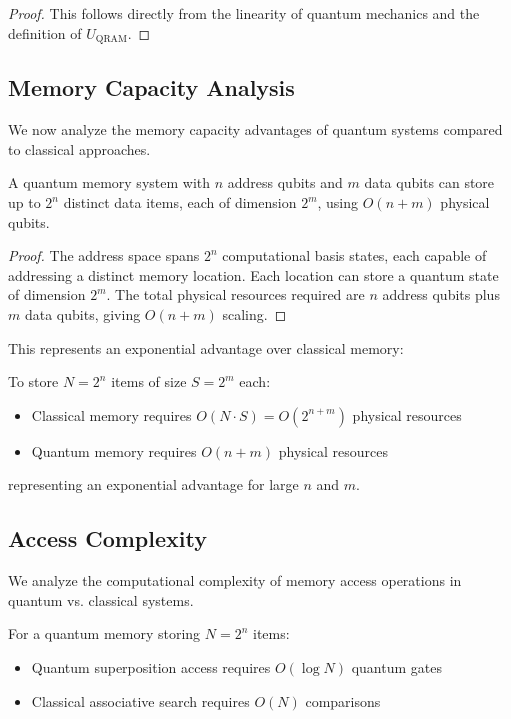\begin{proof}
This follows directly from the linearity of quantum mechanics and the definition of $U_{\text{QRAM}}$.
\end{proof}

\subsection{Memory Capacity Analysis}

We now analyze the memory capacity advantages of quantum systems compared to classical approaches.

\begin{theorem}
\label{thm:capacity}
A quantum memory system with $n$ address qubits and $m$ data qubits can store up to $2^n$ distinct data items, each of dimension $2^m$, using $O(n + m)$ physical qubits.
\end{theorem}

\begin{proof}
The address space spans $2^n$ computational basis states, each capable of addressing a distinct memory location. Each location can store a quantum state of dimension $2^m$. The total physical resources required are $n$ address qubits plus $m$ data qubits, giving $O(n + m)$ scaling.
\end{proof}

This represents an exponential advantage over classical memory:

\begin{corollary}
\label{cor:scaling}
To store $N = 2^n$ items of size $S = 2^m$ each:
\begin{itemize}
    \item Classical memory requires $O(N \cdot S) = O(2^{n+m})$ physical resources
    \item Quantum memory requires $O(n + m)$ physical resources
\end{itemize}
representing an exponential advantage for large $n$ and $m$.
\end{corollary}

\subsection{Access Complexity}

We analyze the computational complexity of memory access operations in quantum vs. classical systems.

\begin{theorem}
\label{thm:access_complexity}
For a quantum memory storing $N = 2^n$ items:
\begin{itemize}
    \item Quantum superposition access requires $O(\log N)$ quantum gates
    \item Classical associative search requires $O(N)$ comparisons
\end{itemize}
\end{theorem}

